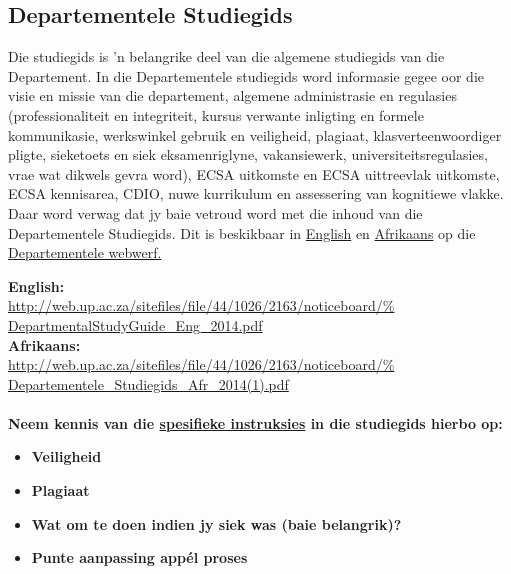     \subsection{Departementele Studiegids}
    Die studiegids is 'n belangrike deel van die algemene studiegids
    van die Departement. In die Departementele studiegids word
    informasie gegee oor die visie en missie van die departement,
    algemene administrasie en regulasies (professionaliteit en
    integriteit, kursus verwante inligting en formele kommunikasie,
    werkswinkel gebruik en veiligheid, plagiaat, klasverteenwoordiger
    pligte, sieketoets en siek eksamenriglyne, vakansiewerk,
    universiteitsregulasies, vrae wat dikwels gevra word), ECSA
    uitkomste en ECSA uittreevlak uitkomste, ECSA kennisarea, CDIO,
    nuwe kurrikulum en assessering van kognitiewe vlakke.  Daar word
    verwag dat jy baie vetroud word met die inhoud van die
    Departementele Studiegids.  Dit is beskikbaar in 
\href{http://web.up.ac.za/sitefiles/file/44/1026/2163/noticeboard/%
        DepartmentalStudyGuide\_Eng\_2014.pdf}{English}
    en
    \href{http://web.up.ac.za/sitefiles/file/44/1026/2163/noticeboard/%
        Departementele\_Studiegids\_Afr\_2014(1).pdf}{Afrikaans}
    op die
    \href{http://web.up.ac.za/default.asp?ipkCategoryID=11426&%
        subid=11426&ipklookid=7}{Departementele webwerf.}

    \noindent
    \textbf{English:} \\
    \url{http://web.up.ac.za/sitefiles/file/44/1026/2163/noticeboard/%
        DepartmentalStudyGuide\_Eng\_2014.pdf} \\
    \textbf{Afrikaans:} \\
    \url{http://web.up.ac.za/sitefiles/file/44/1026/2163/noticeboard/%
        Departementele\_Studiegids\_Afr\_2014(1).pdf} \\~\\

    \noindent
    \textbf{Neem kennis van die \uline{spesifieke instruksies} in die
      studiegids hierbo op:}
    \begin{itemize}
        \item \textbf{Veiligheid}
        \item \textbf{Plagiaat}
        \item \textbf{Wat om te doen indien jy siek was (baie belangrik)?}
        \item \textbf{Punte aanpassing app\'el proses}
    \end{itemize}